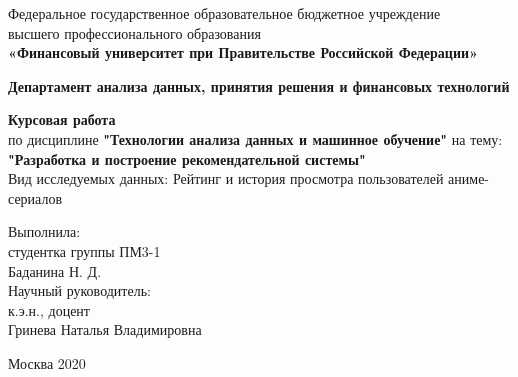 \documentclass{article}
\begin{document}
                                                         
\newpage
\thispagestyle{empty}

\begin{center}
Федеральное государственное образовательное бюджетное учреждение\\ высшего профессионального образования\\ 
\textbf{«Финансовый университет при Правительстве Российской Федерации»}\\
\end{center}
	
\vspace{2em}
	
\begin{center}
\textbf{Департамент анализа данных, принятия решения и финансовых технологий}\\ 
\end{center}
	
\vspace{2em}
	
\begin{center}
\textbf{Курсовая работа\\
\vspace{3mm}}
по дисциплине \textbf{"Технологии анализа данных и машинное обучение"} на тему: \\ \vspace{2em} \textbf{"Разработка и построение рекомендательной системы"}\\
\vspace{3mm}
Вид исследуемых данных: Рейтинг и история просмотра пользователей аниме-сериалов\\
\end{center}
	
\vspace{6em}
		
\begin{flushright}
Выполнила:\\
студентка группы ПМ3-1\\
Баданина Н. Д.\\
Научный руководитель:\\
к.э.н., доцент\\
Гринева Наталья Владимировна
\end{flushright}
	
\vspace{\fill}
	
\begin{center}
Москва 2020
\end{center}
\end{document}
